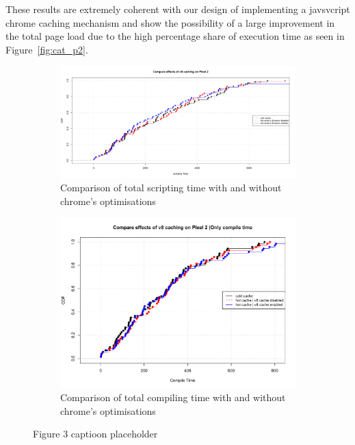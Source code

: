 These results are extremely coherent with our design of implementing a
javsvcript chrome caching mechanism and show the possibility of a
large improvement in the total page load due to the high percentage
share of execution time as seen in Figure~\ref{fig:cat_p2}.
\begin{figure}[!bth]
\begin{subfigure}[b]{0.5\textwidth}
\centering
\includegraphics[width=0.9\columnwidth]{figs/v8cache_P2_scripting.pdf}
\caption{Comparison of total scripting time with and without chrome's optimisations}
\label{fig:scripting_p2}
\end{subfigure}
\begin{subfigure}[b]{0.5\textwidth}
\centering
\includegraphics[width=0.9\columnwidth]{figs/v8cache_P2_compile.pdf}
\caption{Comparison of total compiling time with and without chrome's optimisations}
\label{fig:compile_p2}
\end{subfigure}
\caption{{\color{red}Figure 3 captioon placeholder}}
\end{figure}

